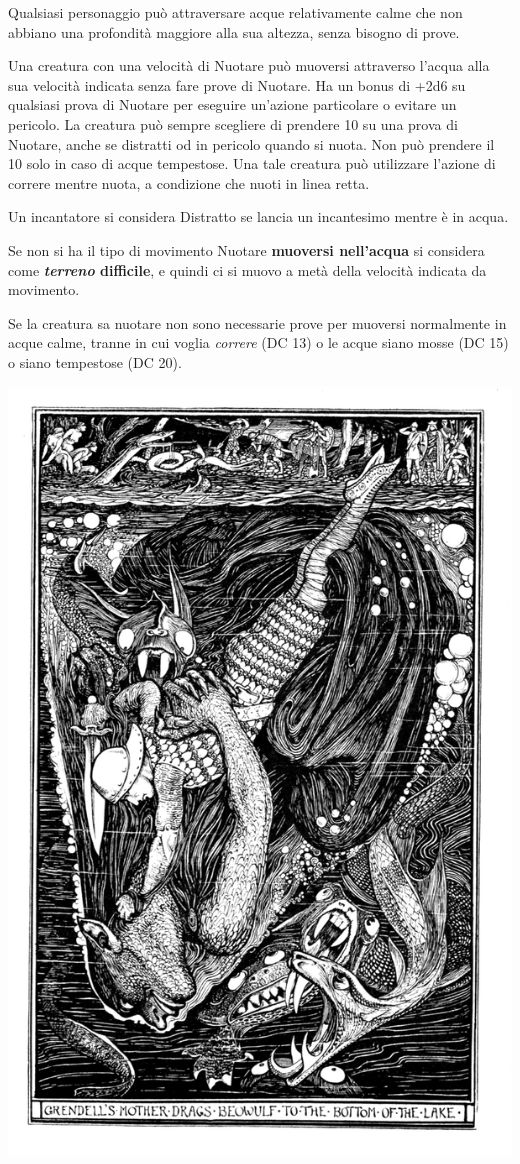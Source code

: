 \begin{multicols}{2}
Qualsiasi personaggio può attraversare acque relativamente calme che non abbiano una profondità maggiore alla sua altezza, senza bisogno di prove.

Una creatura con una velocità di Nuotare può muoversi attraverso l'acqua alla sua velocità indicata senza fare prove di Nuotare. Ha un bonus di +2d6 su qualsiasi prova di Nuotare per eseguire un'azione particolare o evitare un pericolo.
La creatura può sempre scegliere di prendere 10 su una prova di Nuotare, anche se distratti od in pericolo quando si nuota. Non può prendere il 10 solo in caso di acque tempestose. Una tale creatura può utilizzare l'azione di correre mentre nuota, a condizione che nuoti in linea retta.

Un incantatore si considera Distratto se lancia un incantesimo mentre è in acqua.

Se non si ha il tipo di movimento Nuotare \textbf{muoversi nell'acqua} si considera come \textbf{\emph{terreno} difficile}, e quindi ci si muovo a metà della velocità indicata da movimento.

Se la creatura sa nuotare non sono necessarie prove per muoversi normalmente in acque calme, tranne in cui voglia \emph{correre} (DC 13) o le acque siano mosse (DC 15) o siano tempestose (DC 20).

\medskip

\begin{center}
	\includegraphics[width=0.7\linewidth]{immagini/affogare.png}


\end{center}
\end{multicols}
